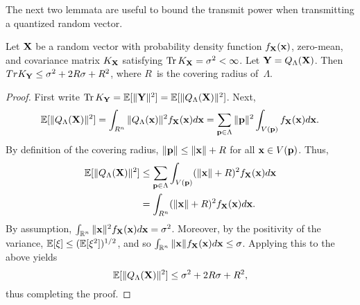 %
%
The next two lemmata are useful to bound the transmit power when transmitting a
quantized random vector.
\begin{lemma}
  \label{lem:latquantvar}
  Let $\mathbf{X}$ be a random vector with probability density function $f_{\mathbf{X}}(\mathbf{x})$,
  zero-mean, and covariance matrix $K_{\mathbf{X}}$ satisfying $\operatorname{Tr} K_{\mathbf{X}} = {\sigma^2} <
  \infty$. Let $\mathbf{Y} = {Q_{\Lambda}}(\mathbf{X})$. Then $Tr K_{\mathbf{Y}} \le {\sigma^2} + 2R\sigma + R^2$, 
  where $R$~is the covering radius of~$\Lambda$.
\end{lemma}

\begin{proof}
  First write $\operatorname{Tr} K_{\mathbf{Y}} = \mathbb{E}[\|\mathbf{Y}\|^2] = \mathbb{E}[\|{Q_{\Lambda}}(\mathbf{X})\|^2]$. Next,
  \begin{equation*}
    \mathbb{E}[\|{Q_{\Lambda}}(\mathbf{X})\|^2] = \int_{R^n} \|{Q_{\Lambda}}(\mathbf{x})\|^2 f_{\mathbf{X}}(\mathbf{x}) d\mathbf{x}
    = \sum_{\mathbf{p} \in \Lambda} \|\mathbf{p}\|^2 \int_{V(\mathbf{p})} f_{\mathbf{X}}(\mathbf{x}) d\mathbf{x}.
  \end{equation*}
  By definition of the covering radius, $\|\mathbf{p}\| \le \|\mathbf{x}\| + R$ for all $\mathbf{x} \in
  V(\mathbf{p})$. Thus,
  \begin{align*}
    \mathbb{E}[\|{Q_{\Lambda}}(\mathbf{X})\|^2] &\le \sum_{\mathbf{p} \in \Lambda} \int_{V(\mathbf{p})} (\|\mathbf{x}\| + R)^2
    f_{\mathbf{X}}(\mathbf{x}) d\mathbf{x} \\
    &= \int_{R^n} (\|\mathbf{x}\| + R)^2 f_{\mathbf{X}}(\mathbf{x}) d\mathbf{x}.
  \end{align*}
  By assumption, $\int_{\mathbb{R}^n} \|\mathbf{x}\|^2 f_{\mathbf{X}}(\mathbf{x}) d\mathbf{x} = {\sigma^2}$. Moreover, by the
  positivity of the variance, $\mathbb{E}[\xi] \le (\mathbb{E}[\xi^2])^{1/2}$, and so
  $\int_{\mathbb{R}^n} \|\mathbf{x}\| f_{\mathbf{X}}(\mathbf{x}) d\mathbf{x} \le \sigma$. Applying this to the above
  yields
  \begin{equation*}
    \mathbb{E}[\|{Q_{\Lambda}}(\mathbf{X})\|^2] \le {\sigma^2} + 2R\sigma + R^2,
  \end{equation*}
  thus completing the proof.
\end{proof}

